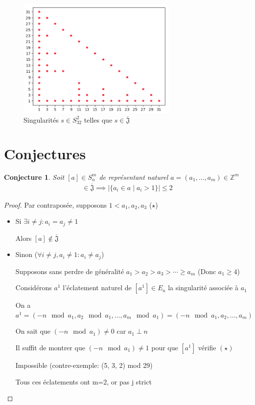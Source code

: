 \documentclass{article}
\newtheorem{conjecture}{Conjecture}
\begin{document}
\begin{figure}[h]
    \caption{Singularités $s \in S_{32}^2$ telles que $s \in \overline{\mathfrak{J}}$}
    \centering
    \includegraphics[width=0.7\textwidth]{singularite_j_strict_m2_n32}
\end{figure}

\newpage

\section{Conjectures}

\begin{conjecture}
    Soit $[a] \in S_n^m$ de représentant naturel $a = (a_1, \dots, a_m) \in \mathbb{Z}^m$
    \begin{align*}
        [a] \in \overline{\mathfrak{J}} \implies |\{ a_i \in a \mid a_i > 1 \}| \leq 2
    \end{align*}
\end{conjecture}

\begin{proof}
    Par contraposée, supposons $1 < a_1, a_2, a_3$ ($\star$)

    \begin{itemize}
        \item Si $\exists i \neq j : a_i = a_j \neq 1$
        
            Alors $[a] \not \in \overline{\mathfrak{J}}$
        \item Sinon ($\forall i \neq j, a_i \neq 1 : a_i \neq a_j$)
        
            Supposons sans perdre de généralité $a_1 > a_2 > a_3 > \cdots \geq a_m$ (Donc $a_1 \geq 4$)

            Considérons $a^1$ l'éclatement naturel de $[a^1] \in E_a$ la singularité associée à $a_1$

            On a $a^1 = (-n \mod {a_1}, a_2 \mod {a_1}, \dots, a_m \mod {a_1}) = (-n \mod {a_1}, a_2, \dots, a_m)$

            On sait que $(-n \mod {a_1}) \neq 0$ car $a_1 \perp n$

            Il suffit de montrer que $(-n \mod {a_1}) \neq 1$ pour que $[a^1]$ vérifie $(\star)$

            Impossible (contre-exemple: (5, 3, 2) mod 29)

            Tous ces éclatements ont m=2, or pas j strict
    \end{itemize}
\end{proof}
\end{document}
